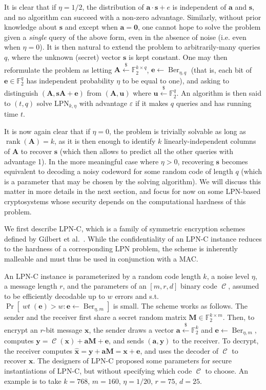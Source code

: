 \documentclass[11pt,a4paper]{article}
\theoremstyle{definition}
\DeclareMathOperator\code{\mathcal{C}}
\DeclareMathOperator\wt{\mathit{wt}}
\DeclareMathOperator\Ber{Ber}
\DeclareMathOperator\rank{rank}
\newcommand\ftwo{\mathbb{F}_{2}}
\newcommand\randraw{\xleftarrow{{\scriptscriptstyle\$}}}
\begin{document}
It is clear that if $\eta = 1/2$, the distribution of $\bm{a}\cdot\bm{s} + e$ is independent of $\bm{a}$ and $\bm{s}$, and no algorithm
can succeed with a non-zero advantage. Similarly, without prior knowledge about $\bm{s}$ and except when $\bm{a} = \bm{0}$, one cannot hope
to solve the problem given a \emph{single} query of the above form, even in the absence of noise (i.e. even when $\eta = 0$). It is then natural to extend the problem to arbitrarily-many queries $q$, where
the unknown (secret) vector $\bm{s}$ is kept constant. One may then reformulate the problem as letting $\bm{A} \randraw \ftwo^{k\times q}$,
$\bm{e} \leftarrow \Ber_{\eta,q}$ (that is, each bit of $\bm{e} \in \ftwo^q$ has independent probability $\eta$ to be equal to one), and asking to distinguish
$(\bm{A},\bm{s}\bm{A} + \bm{e})$ from $(\bm{A}, \bm{u})$ where $\bm{u} \randraw \ftwo^q$. An algorithm is then said to $(t,q)$ solve LPN$_{k,\eta}$ with advantage $\varepsilon$
if it makes $q$ queries and has running time $t$.

It is now again clear that if $\eta = 0$, the problem is trivially solvable as long as $\rank(\bm{A}) = k$, as it is then enough to identify $k$ linearly-independent columns of $\bm{A}$ to recover
$\bm{s}$ (which then allows to predict all the other queries with advantage 1). In the more meaningful case where $\eta > 0$, recovering $\bm{s}$ becomes equivalent to decoding a noisy codeword for
some random code of length $q$ (which is a parameter that may be chosen by the solving algorithm).
We will discuss this matter in more details in the next section, and focus for now on some LPN-based cryptosystems whose security depends on the computational hardness of this problem.

\bigskip

We first describe LPN-C, which is a family of symmetric encryption schemes defined by Gilbert et al.~\cite{LPNC}. While the confidentiality of an LPN-C instance reduces to the hardness of a corresponding
LPN problem, the scheme is inherently malleable and must thus be used in conjunction with a MAC.

An LPN-C instance is parameterized by a random code length $k$, a noise level $\eta$, a message length $r$, and the parameters of an $[m,r,d]$ binary code $\code$, assumed to be efficiently decodable up to $w$ errors and s.t. $\Pr[\wt(\bm{e}) > w : \bm{e} \leftarrow \Ber_{\eta,m}]$
is small.
The scheme works as follows. The sender and the receiver first share a secret random matrix $\bm{M} \in \ftwo^{k\times m}$. Then, to encrypt an $r$-bit message $\bm{x}$, the sender
draws a vector $\bm{a} \randraw \ftwo^k$ and $\bm{e} \leftarrow \Ber_{\eta,m}$, computes $\bm{y} = \code(\bm{x}) + \bm{a}\bm{M} + \bm{e}$, and sends $(\bm{a},\bm{y})$ to the receiver.
To decrypt, the receiver computes $\hat{\bm{x}} = \bm{y} + \bm{a}\bm{M} = \bm{x} + \bm{e}$, and uses the decoder of $\code$ to recover $\bm{x}$.
The designers of LPN-C proposed some parameters for secure instantiations of LPN-C, but without specifying which code $\code$ to choose. An example is to take $k = 768$, $m = 160$, $\eta = 1/20$, $r = 75$, $d = 25$.
\end{document}
